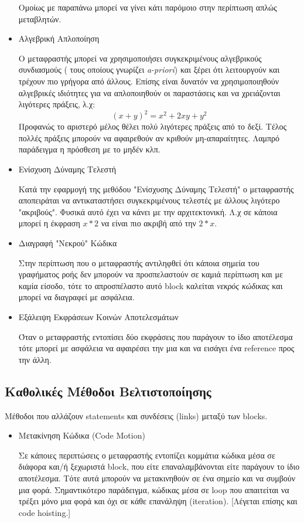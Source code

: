 \begin{itemize}
Ομοίως με παραπάνω μπορεί να γίνει κάτι παρόμοιο στην περίπτωση απλώς
μεταβλητών.

\item Αλγεβρική Απλοποίηση

Ο μεταφραστής μπορεί να χρησιμοποιήσει συγκεκριμένους αλγεβρικούς συνδιασμούς (
τους οποίους γνωρίζει \textit{a-priori}) και ξέρει ότι λειτουργούν και τρέχουν 
πιο γρήγορα από άλλους. Επίσης είναι δυνατόν να χρησιμοποιηθούν αλγεβρικές 
ιδιότητες για να απλοποιηθούν οι παραστάσεις και να χρειάζονται λιγότερες 
πράξεις, λ.χ:
\[
(x+y)^2 = x^2 + 2xy + y^2
\]
Προφανώς το αριστερό μέλος θέλει πολύ λιγότερες πράξεις από το δεξί.
Τέλος πολλές πράξεις μπορούν να αφαιρεθούν αν κριθούν μη-απαραίτητες. Λαμπρό 
παράδειγμα η πρόσθεση με το μηδέν κλπ.

\item Ενίσχυση Δύναμης Τελεστή

Κατά την εφαρμογή της μεθόδου "Ενίσχυσης Δύναμης Τελεστή" ο μεταφραστής
αποπειράται να αντικαταστήσει συγκεκριμένους τελεστές με άλλους λιγότερο
"ακριβούς". Φυσικά αυτό έχει να κάνει με την αρχιτεκτονική. Λ.χ σε κάποια μπορεί
η έκφραση $ x * 2 $ να είναι πιο ακριβή από την $ 2 * x $.

\item Διαγραφή "Νεκρού" Κώδικα

Στην περίπτωση που ο μεταφραστής αντιληφθεί ότι κάποια σημεία του γραφήματος
ροής δεν μπορούν να προσπελαστούν σε καμιά περίπτωση και με καμία είσοδο, τότε
το απροσπέλαστο αυτό block καλείται \textit{νεκρός κώδικας} και μπορεί να
διαγραφεί με ασφάλεια.

\item Εξάλειψη Εκφράσεων Κοινών Αποτελεσμάτων

Όταν ο μεταφραστής εντοπίσει δύο εκφράσεις που παράγουν το ίδιο αποτέλεσμα τότε 
μπορεί με ασφάλεια να αφαιρέσει την μια και να εισάγει ένα reference προς την 
άλλη.

\end{itemize}

\subsection{Καθολικές Μέθοδοι Βελτιστοποίησης}

Μέθοδοι που αλλάζουν statements και συνδέσεις (links) μεταξύ των blocks.

\begin{itemize}

\item Μετακίνηση Κώδικα (Code Motion)

Σε κάποιες περιπτώσεις ο μεταφραστής εντοπίζει κομμάτια κώδικα μέσα σε διάφορα
και/ή ξεχωριστά block, που είτε επαναλαμβάνονται είτε παράγουν το ίδιο
αποτέλεσμα. Τότε αυτά μπορούν να μετακινηθούν σε ένα σημείο και να συμβούν μια
φορά. Σημαντικότερο παράδειγμα, κώδικας μέσα σε loop που απαιτείται να τρέξει
μόνο μια φορά και όχι σε κάθε επανάληψη (iteration). [Λέγεται επίσης και code
hoisting.]

\end{itemize}

